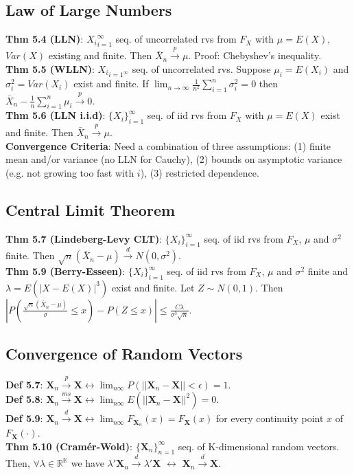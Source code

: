 \subsection{Law of Large Numbers}
\textbf{Thm 5.4 (LLN)}: ${X_i}_{i=1}^\infty$ seq. of uncorrelated rvs from $F_X$ with $\mu = E(X)$, $Var(X)$ existing and finite. Then $\bar{X}_n \xrightarrow{p}\mu$. Proof: Chebyshev's inequality.\\
\textbf{Thm 5.5 (WLLN)}: ${X_i}_{i=1^\infty}$ seq. of uncorrelated rvs. Suppose $\mu_i = E(X_i)$ and $\sigma_i^2 = Var(X_i)$ exist and finite. If $\lim_{n\to\infty}\frac{1}{n^2}\sum_{i=1}^n\sigma_i^2 = 0$ then $\bar{X}_n - \frac{1}{n}\sum_{i=1}^n\mu_i \xrightarrow{p} 0$. \\
\textbf{Thm 5.6 (LLN i.i.d)}: $\{X_i\}_{i=1}^\infty$ seq. of iid rvs from $F_X$ with $\mu=E(X)$ exist and finite. Then $\bar{X}_n\xrightarrow{p}\mu$.\\
\textbf{Convergence Criteria}: Need a combination of three assumptions: (1) finite mean and/or variance (no LLN for Cauchy), (2) bounds on asymptotic variance (e.g. not growing too fast with $i$), (3) restricted dependence.

\subsection{Central Limit Theorem}
\textbf{Thm 5.7 (Lindeberg-Levy CLT)}: $\{X_i\}_{i=1}^\infty$ seq. of iid rvs from $F_X$, $\mu$ and $\sigma^2$ finite. Then $\sqrt{n}(\bar{X}_n-\mu) \xrightarrow{d} N(0,\sigma^2)$. \\
\textbf{Thm 5.9 (Berry-Esseen)}: $\{X_i\}_{i=1}^\infty$ seq. of iid rvs from $F_X$, $\mu$ and $\sigma^2$ finite and $\lambda = E(|X-E(X)|^3)$ exist and finite. Let $Z\sim N(0,1)$. Then $|P\left(\frac{\sqrt{n}(\bar{X}_n-\mu)}{\sigma}\leq x\right) - P(Z\leq x)| \leq \frac{C\lambda}{\sigma^3\sqrt{n}}$.\\

\subsection{Convergence of Random Vectors}
\textbf{Def 5.7}: $\textbf{X}_n \xrightarrow{p} \textbf{X} \leftrightarrow \lim_{n\infty}P(||\textbf{X}_n - \textbf{X}||<\epsilon)=1$.\\
\textbf{Def 5.8}: $\textbf{X}_n \xrightarrow{ms} \textbf{X} \leftrightarrow \lim_{n\infty}E(||\textbf{X}_n - \textbf{X}||^2)=0$.\\
\textbf{Def 5.9}: $\textbf{X}_n \xrightarrow{d} \textbf{X} \leftrightarrow \lim_{n\infty}F_{\textbf{X}_n}(x) = F_\textbf{X}(x)$ for every continuity point $x$ of $F_\textbf{X}(\cdot)$.\\
\textbf{Thm 5.10 (Cramér-Wold)}: $\{\textbf{X}_n\}_{n=1}^\infty$ seq. of K-dimensional random vectors. Then, $\forall \lambda\in\mathbb{R^K}$ we have $\lambda'\textbf{X}_n \xrightarrow{d} \lambda'\textbf{X}$ $\leftrightarrow$ $\textbf{X}_n \xrightarrow{d} \textbf{X}$.

